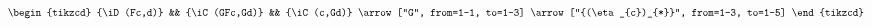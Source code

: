 \[\begin{tikzcd}
	{\iD(Fc,d)} && {\iC(GFc,Gd)} && {\iC(c,Gd)}
	\arrow["G", from=1-1, to=1-3]
	\arrow["{(\eta_{c})_{*}}", from=1-3, to=1-5]
\end{tikzcd}\]